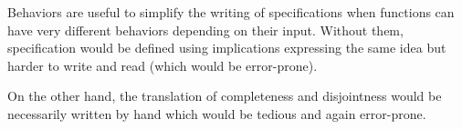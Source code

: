 Behaviors are useful to simplify the writing of specifications when
functions can have very different behaviors depending on their input.
Without them, specification would be defined using implications
expressing the same idea but harder to write and read (which would be
error-prone).



On the other hand, the translation of completeness and disjointness
would be necessarily written by hand which would be tedious and again
error-prone.
